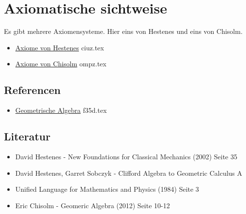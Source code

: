 \documentclass{sajzk}
\begin{document}
\section{Axiomatische sichtweise}
\label{il6v}

Es gibt mehrere Axiomensysteme. Hier eins von Hestenes und eins von Chisolm.
\begin{itemize}
    \item \href{ciuz.pdf}{Axiome von Hestenes} ciuz.tex
    \item \href{ompz.pdf}{Axiome von Chisolm} ompz.tex
\end{itemize}

\subsection{Referencen}
\begin{itemize}
    \item \href{f35d.pdf}{Geometrische Algebra} f35d.tex
\end{itemize}

\subsection{Literatur}
\begin{itemize}
    \item David Hestenes - New Foundations for Classical Mechanics (2002) Seite 35
    \item David Hestenes, Garret Sobczyk - Clifford Algebra to Geometric Calculus A
    \item Unified Language for Mathematics and Physics (1984) Seite 3
    \item Eric Chisolm - Geomeric Algebra (2012) Seite 10-12
\end{itemize}
\end{document}
